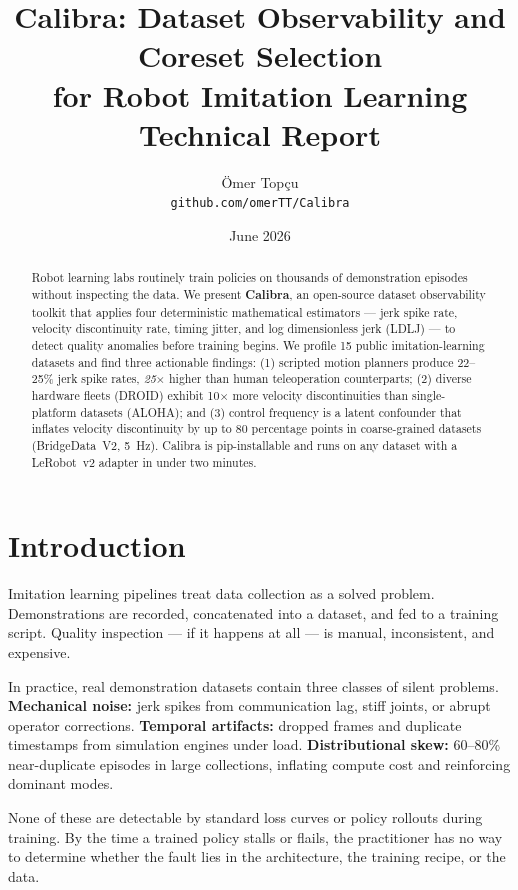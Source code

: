 \documentclass[10pt,twocolumn]{article}
\title{\textbf{Calibra: Dataset Observability and Coreset Selection\\
for Robot Imitation Learning}\\[0.5em]
\large Technical Report}
\author{
  Ömer Topçu\\
  \texttt{github.com/omerTT/Calibra}
}
\date{June 2026}
\begin{document}
\maketitle

\begin{abstract}
Robot learning labs routinely train policies on thousands of demonstration
episodes without inspecting the data. We present \textbf{Calibra}, an
open-source dataset observability toolkit that applies four deterministic
mathematical estimators — jerk spike rate, velocity discontinuity rate,
timing jitter, and log dimensionless jerk (LDLJ) — to detect quality
anomalies before training begins. We profile 15 public imitation-learning
datasets and find three actionable findings: (1) scripted motion planners
produce 22–25\% jerk spike rates, \emph{25$\times$} higher than human
teleoperation counterparts; (2) diverse hardware fleets (DROID) exhibit
10$\times$ more velocity discontinuities than single-platform datasets
(ALOHA); and (3) control frequency is a latent confounder that inflates
velocity discontinuity by up to 80 percentage points in coarse-grained
datasets (BridgeData~V2, 5~Hz). Calibra is pip-installable and runs on
any dataset with a LeRobot~v2 adapter in under two minutes.
\end{abstract}

\section{Introduction}
\label{sec:intro}

Imitation learning pipelines treat data collection as a solved problem.
Demonstrations are recorded, concatenated into a dataset, and fed to a
training script. Quality inspection — if it happens at all — is manual,
inconsistent, and expensive.

In practice, real demonstration datasets contain three classes of silent
problems. \textbf{Mechanical noise:} jerk spikes from communication lag,
stiff joints, or abrupt operator corrections. \textbf{Temporal artifacts:}
dropped frames and duplicate timestamps from simulation engines under load.
\textbf{Distributional skew:} 60–80\% near-duplicate episodes in large
collections, inflating compute cost and reinforcing dominant modes.

None of these are detectable by standard loss curves or policy rollouts
during training. By the time a trained policy stalls or flails, the
practitioner has no way to determine whether the fault lies in the
architecture, the training recipe, or the data.
\end{document}

